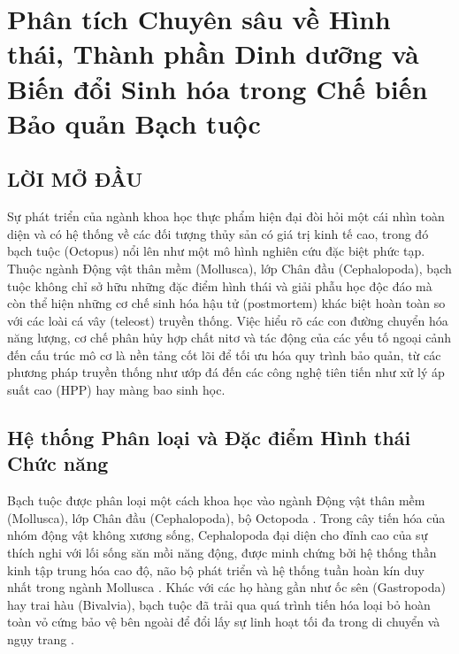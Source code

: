 \documentclass[12pt,a4paper]{report}
\begin{document}
\renewcommand{\contentsname}{MỤC LỤC}
\tableofcontents
\newpage

\setcounter{page}{1}
\pagestyle{fancy}

\chapter{Phân tích Chuyên sâu về Hình thái, Thành phần Dinh dưỡng và Biến đổi Sinh hóa trong Chế biến Bảo quản Bạch tuộc}

\section*{LỜI MỞ ĐẦU}

Sự phát triển của ngành khoa học thực phẩm hiện đại đòi hỏi một cái nhìn toàn diện và có hệ thống về các đối tượng thủy sản có giá trị kinh tế cao, trong đó bạch tuộc (Octopus) nổi lên như một mô hình nghiên cứu đặc biệt phức tạp. Thuộc ngành Động vật thân mềm (Mollusca), lớp Chân đầu (Cephalopoda), bạch tuộc không chỉ sở hữu những đặc điểm hình thái và giải phẫu học độc đáo mà còn thể hiện những cơ chế sinh hóa hậu tử (postmortem) khác biệt hoàn toàn so với các loài cá vây (teleost) truyền thống. Việc hiểu rõ các con đường chuyển hóa năng lượng, cơ chế phân hủy hợp chất nitơ và tác động của các yếu tố ngoại cảnh đến cấu trúc mô cơ là nền tảng cốt lõi để tối ưu hóa quy trình bảo quản, từ các phương pháp truyền thống như ướp đá đến các công nghệ tiên tiến như xử lý áp suất cao (HPP) hay màng bao sinh học.

\section{Hệ thống Phân loại và Đặc điểm Hình thái Chức năng}

Bạch tuộc được phân loại một cách khoa học vào ngành Động vật thân mềm (Mollusca), lớp Chân đầu (Cephalopoda), bộ Octopoda \cite{ck12_mollusca}. Trong cây tiến hóa của nhóm động vật không xương sống, Cephalopoda đại diện cho đỉnh cao của sự thích nghi với lối sống săn mồi năng động, được minh chứng bởi hệ thống thần kinh tập trung hóa cao độ, não bộ phát triển và hệ thống tuần hoàn kín duy nhất trong ngành Mollusca \cite{ck12_mollusca}. Khác với các họ hàng gần như ốc sên (Gastropoda) hay trai hàu (Bivalvia), bạch tuộc đã trải qua quá trình tiến hóa loại bỏ hoàn toàn vỏ cứng bảo vệ bên ngoài để đổi lấy sự linh hoạt tối đa trong di chuyển và ngụy trang \cite{ck12_mollusca}.
\end{document}
